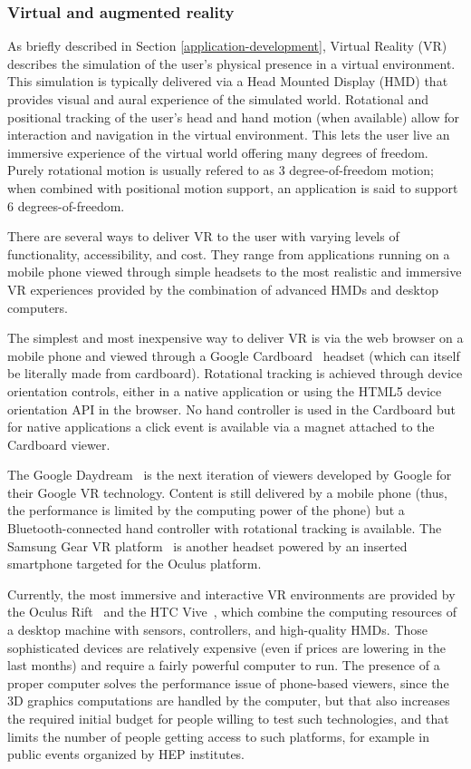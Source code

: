 \documentclass[12pt,a4paper]{article}
\begin{document}
\hypertarget{vr}{%
\subsubsection{Virtual and augmented reality}\label{vr}}

As briefly described in Section \ref{application-development}, Virtual Reality (VR) describes the simulation of the user’s
physical presence in a virtual environment. This simulation
is typically delivered via a Head Mounted Display (HMD) that provides visual and aural experience of the simulated world.
Rotational and positional tracking of the user’s head and hand motion (when available) allow for interaction and navigation
in the virtual environment. This lets the user live an immersive experience of the virtual world offering many degrees of freedom. Purely rotational motion is usually refered to as
3 degree-of-freedom motion; when combined with positional motion support, an application is said to support 6 degrees-of-freedom.

There are several ways to deliver VR to the user with varying levels of functionality, accessibility, and cost.
They range from applications running on a mobile phone viewed through simple headsets to the most realistic and
immersive VR experiences provided by the combination of advanced HMDs and desktop computers.

The simplest and most inexpensive way to deliver VR is via the web browser on a mobile phone and viewed through a
Google Cardboard~\cite{GoogleCardboard} headset (which can itself be literally made from cardboard).
Rotational tracking is achieved through device orientation
controls, either in a native application or using the HTML5 device orientation API in the browser. No hand controller is
used in the Cardboard but for native applications a click event is available via a magnet attached to the Cardboard viewer.

The Google Daydream~\cite{GoogleDaydream} is the next iteration of viewers developed by Google for their Google VR technology.
Content is still delivered by a mobile phone (thus, the performance is limited by the computing power of the phone) but a
Bluetooth-connected hand controller with rotational tracking is available. The Samsung Gear VR platform~\cite{SamsungGearVR}
is another headset powered by an inserted smartphone targeted for the Oculus platform.

Currently, the most immersive and interactive VR environments are provided by the Oculus Rift~\cite{OculusRift} and the
HTC Vive~\cite{HTCVive}, which combine the computing resources of a desktop machine with sensors, controllers, and high-quality HMDs.
Those sophisticated devices are relatively expensive (even if prices are lowering in the last months) and require a fairly powerful computer to run.
The presence of a proper computer solves the performance issue of phone-based viewers, since the 3D graphics computations are handled
by the computer, but that also increases the required initial budget for people willing to test such technologies, and that limits the number of
people getting access to such platforms, for example in public events organized by HEP institutes.
\end{document}
